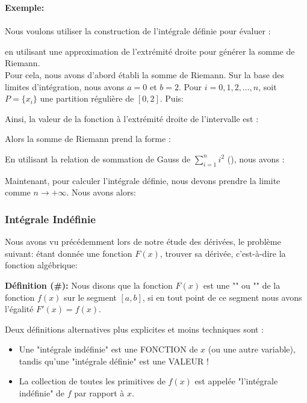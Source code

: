 	\begin{tcolorbox}[colframe=black,colback=white,sharp corners]
	\textbf{{\Large {}}Exemple:}\\\\
	Nous voulons utiliser la construction de l'intégrale définie pour évaluer :
	
	en utilisant une approximation de l'extrémité droite pour générer la somme de Riemann.\\
	
	Pour cela, nous avons d'abord établi la somme de Riemann. Sur la base des limites d'intégration, nous avons $a=0$ et $b=2$. Pour $i=0,1,2,\ldots,n$, soit $P=\{x_i\}$ une partition régulière de $[0,2]$. Puis:
	
	Ainsi, la valeur de la fonction à l'extrémité droite de l'intervalle est :
	
	Alors la somme de Riemann prend la forme :
	
	En utilisant la relation de sommation de Gauss de $\displaystyle\sum_{i=1}^n i^2$ (), nous avons :
	
	Maintenant, pour calculer l'intégrale définie, nous devons prendre la limite comme $n\rightarrow+\infty$. Nous avons alors:
	 
	\end{tcolorbox}
	
	\subsubsection{Intégrale Indéfinie}
	Nous avons vu précédemment lors de notre étude des dérivées, le problème suivant: étant donnée une fonction $F(x)$, trouver sa dérivée, c'est-à-dire la fonction algébrique:
	
	\textbf{Définition (\#\mydef):} Nous disons que la fonction $F (x)$ est une "" ou "" de la fonction $f (x)$ sur le segment $[a, b]$, si en tout point de ce segment nous avons l'égalité $F'(x)=f(x)$.
	
	Deux définitions alternatives plus explicites et moins techniques sont : 
	\begin{itemize}
		\item Une "intégrale indéfinie" est une FONCTION de $x$ (ou une autre variable), tandis qu'une "intégrale définie" est une VALEUR !
		
		\item La collection de toutes les primitives de $f(x)$ est appelée "l'intégrale indéfinie" de $f$ par rapport à $x$.
	\end{itemize}
	
